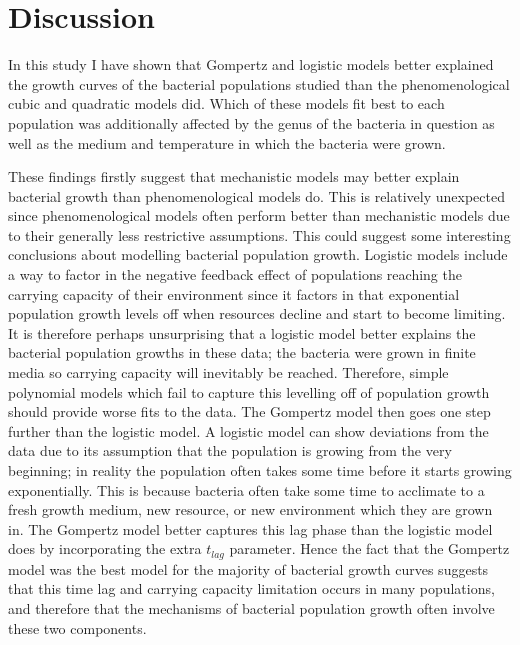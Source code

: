 \documentclass[11pt]{article}
\begin{document}
	
	\newpage
	
	\section{Discussion}
	
	In this study I have shown that Gompertz and logistic models better explained the growth curves of the bacterial populations studied than the phenomenological cubic and quadratic models did. Which of these models fit best to each population was additionally affected by the genus of the bacteria in question as well as the medium and temperature in which the bacteria were grown.
	
	These findings firstly suggest that mechanistic models may better explain bacterial growth than phenomenological models do. This is relatively unexpected since phenomenological models often perform better than mechanistic models due to their generally less restrictive assumptions. This could suggest some interesting conclusions about modelling bacterial population growth. Logistic models include a way to factor in the negative feedback effect of populations reaching the carrying capacity of their environment since it factors in that exponential population growth levels off when resources decline and start to become limiting. It is therefore perhaps unsurprising that a logistic model better explains the bacterial population growths in these data; the bacteria were grown in finite media so carrying capacity will inevitably be reached. Therefore, simple polynomial models which fail to capture this levelling off of population growth should provide worse fits to the data. The Gompertz model then goes one step further than the logistic model. A logistic model can show deviations from the data due to its assumption that the population is growing from the very beginning; in reality the population often takes some time before it starts growing exponentially. This is because bacteria often take some time to acclimate to a fresh growth medium, new resource, or new environment which they are grown in. The Gompertz model better captures this lag phase than the logistic model does by incorporating the extra $t_{lag}$ parameter. Hence the fact that the Gompertz model was the best model for the majority of bacterial growth curves suggests that this time lag and carrying capacity limitation occurs in many populations, and therefore that the mechanisms of bacterial population growth often involve these two components.  
	
\end{document}
